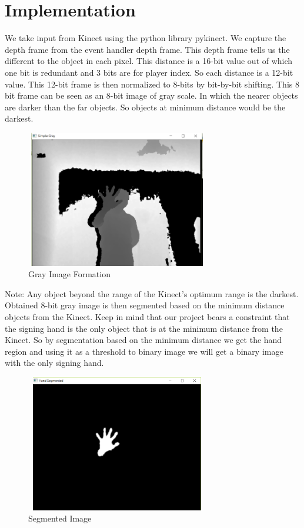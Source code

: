 \section{Implementation}
We take input from Kinect using the python library pykinect. We capture the depth frame from the event handler depth frame. This depth frame tells us the different to the object in each pixel. This distance is a 16-bit value out of which one bit is redundant and 3 bits are for player index. So each distance is a 12-bit value. 
\hfill \break
This 12-bit frame is then normalized to 8-bits by bit-by-bit shifting. This 8 bit frame can be seen as an 8-bit image of gray scale. In which the nearer objects are darker than the far objects. So objects at minimum distance would be the darkest.

\begin{figure}[!htb]
	\begin{center}
		\includegraphics[height=6cm,width=8cm]{ThesisFigs/GrayImage}
		\caption{Gray Image Formation}\label{fig:GrayImage}
	\end{center}
\end{figure}
Note: Any object beyond the range of the Kinect’s optimum range is the darkest.
\hfill \break
Obtained 8-bit gray image is then segmented based on the minimum distance objects from the Kinect. Keep in mind that our project bears a constraint that the signing hand is the only object that is at the minimum distance from the Kinect. So by segmentation based on the minimum distance we get the hand region and using it as a threshold to binary image we will get a binary image with the only signing hand.
\begin{figure}[!htb]
	\begin{center}
		\includegraphics[height=6cm,width=8cm]{ThesisFigs/segmentedImage}
		\caption{Segmented Image}\label{fig:segmentedImage}
	\end{center}
\end{figure}
